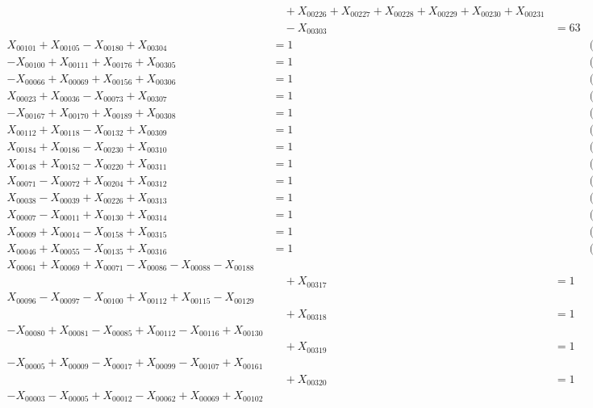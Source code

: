 \documentclass[a4paper,10pt]{article}
\begin{document}
{\begin{align}
&\quad  + X_{00226} + X_{00227} + X_{00228} + X_{00229} + X_{00230} + X_{00231} \\[0.5ex]
&\quad  - X_{00303} &= 63 && \text{(R00072)} \\
X_{00101} + X_{00105} - X_{00180} + X_{00304} &= 1 && \text{(R00073)} \\
-X_{00100} + X_{00111} + X_{00176} + X_{00305} &= 1 && \text{(R00074)} \\
-X_{00066} + X_{00069} + X_{00156} + X_{00306} &= 1 && \text{(R00075)} \\
X_{00023} + X_{00036} - X_{00073} + X_{00307} &= 1 && \text{(R00076)} \\
-X_{00167} + X_{00170} + X_{00189} + X_{00308} &= 1 && \text{(R00077)} \\
X_{00112} + X_{00118} - X_{00132} + X_{00309} &= 1 && \text{(R00078)} \\
X_{00184} + X_{00186} - X_{00230} + X_{00310} &= 1 && \text{(R00079)} \\
X_{00148} + X_{00152} - X_{00220} + X_{00311} &= 1 && \text{(R00080)} \\
\allowbreak
X_{00071} - X_{00072} + X_{00204} + X_{00312} &= 1 && \text{(R00081)} \\
X_{00038} - X_{00039} + X_{00226} + X_{00313} &= 1 && \text{(R00082)} \\
X_{00007} - X_{00011} + X_{00130} + X_{00314} &= 1 && \text{(R00083)} \\
X_{00009} + X_{00014} - X_{00158} + X_{00315} &= 1 && \text{(R00084)} \\
X_{00046} + X_{00055} - X_{00135} + X_{00316} &= 1 && \text{(R00085)} \\
X_{00061} + X_{00069} + X_{00071} - X_{00086} - X_{00088} - X_{00188} \\[0.5ex]
&\quad  + X_{00317} &= 1 && \text{(R00086)} \\
X_{00096} - X_{00097} - X_{00100} + X_{00112} + X_{00115} - X_{00129} \\[0.5ex]
&\quad  + X_{00318} &= 1 && \text{(R00087)} \\
-X_{00080} + X_{00081} - X_{00085} + X_{00112} - X_{00116} + X_{00130} \\[0.5ex]
&\quad  + X_{00319} &= 1 && \text{(R00088)} \\
-X_{00005} + X_{00009} - X_{00017} + X_{00099} - X_{00107} + X_{00161} \\[0.5ex]
&\quad  + X_{00320} &= 1 && \text{(R00089)} \\
-X_{00003} - X_{00005} + X_{00012} - X_{00062} + X_{00069} + X_{00102} \\[0.5ex]

\end{align}}
\end{document}
